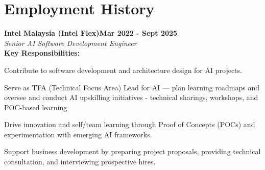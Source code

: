 \documentclass[a4paper,11pt]{article}
\newcommand{\customsubsection}[1]{
	\hspace{20pt}\textbf{#1}\\[-2pt]
	\vspace{4pt}
}
\newcommand{\heading}[2]{
	\hspace{10pt}#1\hfill#2\\
}
\newcommand{\headingBf}[2]{
	\heading{\textbf{#1}}{\textbf{#2}}
}
\newcommand{\headingIt}[2]{
	\heading{\textit{#1}}{\textit{#2}}
}
\newenvironment{resume_list}{
	\vspace{-7pt}
	\begin{itemize}[itemsep=-2px, parsep=1pt, leftmargin=30pt]
	}{
	\end{itemize}
}
\begin{document}
	\section{Employment History}

	\headingBf{Intel Malaysia (Intel Flex)}{Mar 2022 - Sept 2025}
	\headingIt{Senior AI Software Development Engineer}{}
	
	\customsubsection{Key Responsibilities:}
	\begin{resume_list}
		\item Contribute to software development and architecture design for AI projects.
		\item Serve as TFA (Technical Focus Area) Lead for AI — plan learning roadmaps and oversee and conduct AI upskilling initiatives - technical sharings, workshops, and POC-based learning
		\item Drive innovation and self/team learning through Proof of Concepts (POCs) and experimentation with emerging AI frameworks.
		\item Support business development by preparing project proposals, providing technical consultation, and interviewing prospective hires.
	\end{resume_list}
	
\end{document}
